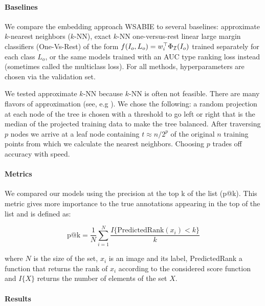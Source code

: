 \paragraph{Baselines}

We compare the embedding approach WSABIE
to several baselines: 
approximate $k$-nearest neighbors ($k$-NN),  exact $k$-NN
one-versus-rest linear large margin classifiers (One-Vs-Rest) of the form 
$f(I_o, L_o) = w_i^\top  \Phi_{\cal I}(I_o)$ trained separately for each class $L_o$,
or the same models trained with an AUC type ranking loss instead (sometimes called the multiclass loss).
For all methods, hyperparameters are chosen via the validation set.


We tested approximate $k$-NN because $k$-NN is often not feasible. There are many
flavors of approximation (see, e.g \cite{Fergus:small_codes}). We chose the following: 
a random projection at each node of the tree is chosen
with a threshold to go left or right that is the median of the projected training data to make the tree 
balanced. After traversing $p$ nodes we arrive at a leaf node containing
$ t \approx n/2^p  $ of the original $n$ training points from which we calculate the nearest neighbors. 
Choosing $p$ trades off accuracy with speed.

\paragraph{Metrics}

We compared our models using the precision at the top k of the list
(p@k). This metric gives more
importance to the true annotations appearing in the top of the list and is defined as:

\[
  \textrm{p@k} = \frac{1}{N} \sum_{i=1}^{N} \dfrac{I\{\textrm{PredictedRank}(x_i)< k\}}{k}
\]

where $N$ is the size of the set, $x_i$ is an image and its label, PredictedRank
a function that returns the rank of $x_i$ according to the considered
score function and $I\{X\}$ returns the number of elements of the set $X$.

\paragraph{Results}

